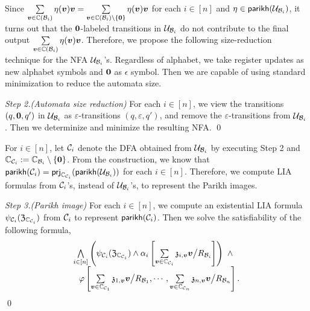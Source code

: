 Since
$\sum \limits_{\myvec{v} \in \costset(\cB_i)} \eta(\myvec{v}) \myvec{v} = \sum \limits_{\myvec{v} \in \costset(\cB_i) \setminus \{\myvec{0}\}} \eta(\myvec{v}) \myvec{v}$ for each $i \in [n]$ and $\eta \in \mathsf{parikh}(\mathcal{U}_{\mathcal{B}_i})$, it turns out that 
the $\myvec{0}$-labeled transitions in $\mathcal{U}_{\mathcal{B}_i}$ do not contribute to the final output $\sum \limits_{\myvec{v} \in \costset(\cB_i)} \eta(\myvec{v}) \myvec{v}$. Therefore, we propose the following size-reduction technique for the NFA $\mathcal{U}_{\mathcal{B}_i}$'s. Regardless of alphabet, we take register updates as new alphabet symbols and $\myvec{0}$ as $\epsilon$ symbol. Then we are capable of using standard minimization to reduce the automata size.

\medskip
\noindent
\emph{Step 2.(Automata size reduction)} For each $i \in [n]$, we view the transitions $(q, \myvec{0}, q')$ in $\mathcal{U}_{\mathcal{B}_i}$ as $\varepsilon$-transitions $(q, \varepsilon, q')$, and remove the $\varepsilon$-transitions from $\mathcal{U}_{\mathcal{B}_i}$. Then we determinize and minimize the resulting NFA.   \qed

For $i \in [n]$, let  $\mathcal{C}_i$ denote the DFA obtained from $\mathcal{U}_{\mathcal{B}_i}$ by executing Step 2 and $\costset_{\cC_i} := \costset_{\cB_i} \setminus \{\myvec{0}\}$. From the construction, we know that $\mathsf{parikh}(\mathcal{C}_i) = {\sf prj}_{\mathbb{C}_{\mathcal{C}_i}}(\mathsf{parikh}(\mathcal{U}_{\mathcal{B}_i}))$ for each $i \in [n]$.
Therefore, we compute LIA formulas from $\mathcal{C}_i$'s, instead of $\mathcal{U}_{\mathcal{B}_i}$'s, to represent the Parikh images. 

\medskip
\noindent
\emph{Step 3.(Parikh image)} For each $i \in [n]$, we compute an existential LIA formula $\psi_{\mathcal{C}_i}(\mathfrak{Z}_{\mathbb{C}_{\mathcal{C}_i}})$ from $\mathcal{C}_i$ to represent $\mathsf{parikh}(\mathcal{C}_i)$. Then we solve the satisfiability of the following formula,
%
\[
\begin{array}{l}
\bigwedge \limits_{i \in [n]} \left(\psi_{\cC_i}(\fZ_{\costset_{\cC_i}}) \wedge \alpha_i\left[\sum\limits_{\myvec{v} \in \costset_{\cC_i}} \anivarz_{i, \myvec{v}} \myvec{v} \big{/}R_{\cB_i}  \right] \right) \ \wedge \\
\ \ \varphi \left[ \sum\limits_{\myvec{v} \in \costset_{\cC_1}} \anivarz_{1, \myvec{v}} \myvec{v} \big{/}R_{\cB_1}, \cdots, \sum\limits_{\myvec{v} \in \costset_{\cC_n}} \anivarz_{n, \myvec{v}} \myvec{v} \big{/}R_{\cB_n} \right].
\end{array}
\]
\qed